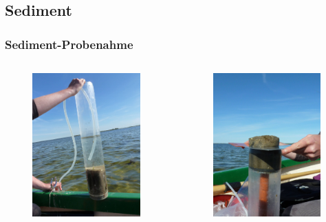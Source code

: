 \documentclass{beamer}
\begin{document}
\subsection{Sediment}
\begin{frame}
\frametitle{Sediment-Probenahme}
\begin{columns}
\begin{column}{6.4cm}
\begin{figure}
\includegraphics[height=55mm]{images/Fotos/Sedimentstechen.jpg}
\hspace*{-8mm}
\end{figure}
\end{column}
\begin{column}{6.4cm}
\begin{figure}
\includegraphics[height=55mm]{images/Fotos/Stempeln.jpg}
\hspace*{+8mm}
\end{figure}
\end{column}
\end{columns}
\end{frame}
\end{document}
